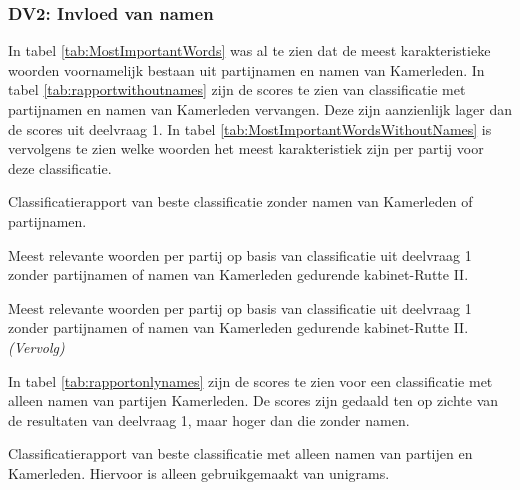 \subsubsection{DV2: Invloed van namen}
In tabel \ref{tab:MostImportantWords} was al te zien dat de meest karakteristieke woorden voornamelijk bestaan uit partijnamen en namen van Kamerleden. In tabel \ref{tab:rapportwithoutnames} zijn de scores te zien van classificatie met partijnamen en namen van Kamerleden vervangen. Deze zijn aanzienlijk lager dan de scores uit deelvraag 1. In tabel \ref{tab:MostImportantWordsWithoutNames} is vervolgens te zien welke woorden het meest karakteristiek zijn per partij voor deze classificatie.\par
\begin{table}[H]
\caption{Classificatierapport van beste classificatie zonder namen van Kamerleden of partijnamen.}
\label{tab:rapportwithoutnames}
\centering

\end{table}

\begin{table}[H] 
\caption{Meest relevante woorden per partij op basis van classificatie uit deelvraag 1 zonder partijnamen of namen van Kamerleden gedurende kabinet-Rutte II.} 
\label{tab:MostImportantWordsWithoutNames} 
\centering
\hspace*{-1in}
 
\end{table} 
\addtocounter{table}{-1} 
\begin{table}[H] 
\caption{Meest relevante woorden per partij op basis van classificatie uit deelvraag 1 zonder partijnamen of namen van Kamerleden gedurende kabinet-Rutte II. \emph{(Vervolg)}} 
\centering
\hspace*{-0.6in}
 
\end{table}

In tabel \ref{tab:rapportonlynames} zijn de scores te zien voor een classificatie met alleen namen van partijen Kamerleden. De scores zijn gedaald ten op zichte van de resultaten van deelvraag 1, maar hoger dan die zonder namen.\par
\begin{table}[H]
\caption{Classificatierapport van beste classificatie met alleen namen van partijen en Kamerleden. Hiervoor is alleen gebruikgemaakt van unigrams.}
\label{tab:rapportonlynames}
\centering

\end{table}

